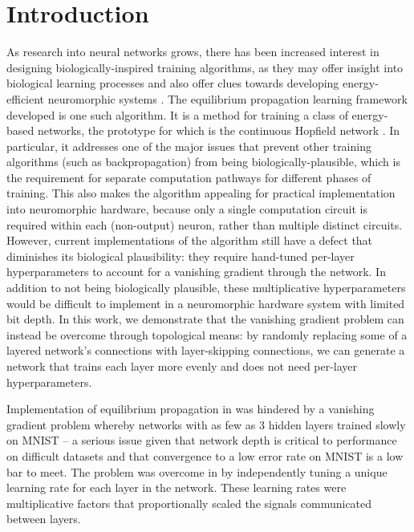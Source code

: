 \documentclass[utf8]{frontiersSCNS}
\begin{document}
\section{Introduction}

As research into neural networks grows, there has been increased interest in designing biologically-inspired training algorithms, as they may offer insight into biological learning processes and also offer clues towards developing energy-efficient neuromorphic systems \citep{wozniak2018, crafton2019, ernoult2020, bartunov2018, lillicrap2014, bengio2015}. The equilibrium propagation learning framework developed \cite{scellier17} is one such algorithm.  It is a method for training a class of energy-based networks, the prototype for which is the continuous Hopfield network \cite{hopfield1984}.  In particular, it addresses one of the major issues that prevent other training algorithms (such as backpropagation) from being biologically-plausible, which is the requirement for separate computation pathways for different phases of training. This also makes the algorithm appealing for practical implementation into neuromorphic hardware, because only a single computation circuit is required within each (non-output) neuron, rather than multiple distinct circuits. However, current implementations of the algorithm still have a defect that diminishes its biological plausibility: they require hand-tuned per-layer hyperparameters to account for a vanishing gradient through the network. In addition to not being biologically plausible, these multiplicative hyperparameters would be difficult to implement in a neuromorphic hardware system with limited bit depth. In this work, we demonstrate that the vanishing gradient problem can instead be overcome through topological means: by randomly replacing some of a layered network's connections with layer-skipping connections, we can generate a network that trains each layer more evenly and does not need per-layer hyperparameters.


Implementation of equilibrium propagation in \citep{scellier17} was hindered by a vanishing gradient problem whereby networks with as few as 3 hidden layers trained slowly on MNIST \citep{mnist1998} -- a serious issue given that network depth is critical to performance on difficult datasets \citep{simonyan2014, srivastava2015tvdn} and that convergence to a low error rate on MNIST is a low bar to meet. The problem was overcome in \citep{scellier17} by independently tuning a unique learning rate for each layer in the network.  These learning rates were multiplicative factors that proportionally scaled the signals communicated between layers.
\end{document}
